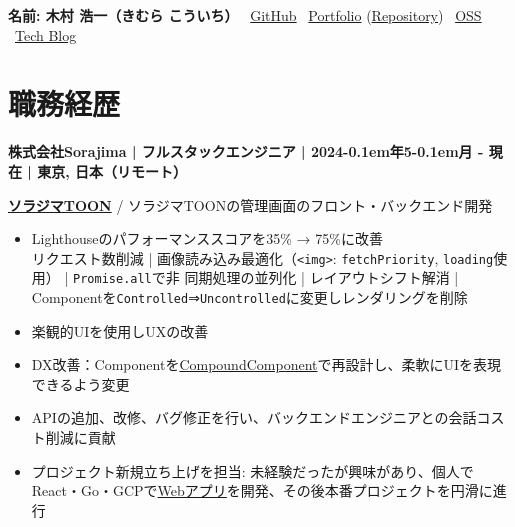 \documentclass{article}
\begin{document}
\noindent
\textbf{\large 名前: 木村 浩一（きむら こういち）} \textbar\
\href{https://github.com/kupuma-ru21}{GitHub} \textbar\
\href{https://kupuma-ru21.com/}{Portfolio} (\href{https://github.com/kupuma-ru21/portfolio}{Repository}) \textbar\
\href{https://github.com/kupuma-ru21/kupuma-ru21/blob/main/OSS.md}{OSS} \textbar\
\href{https://github.com/kupuma-ru21/kupuma-ru21/blob/main/TECH_BLOG.md}{Tech Blog}

\vspace{-1em}

\section*{職務経歴}

\noindent
\textbf{株式会社Sorajima | フルスタックエンジニア | 2024\kern-0.1em年5\kern-0.1em月 - 現在 | 東京, 日本（リモート）}

\vspace{0.15em}

\textbf{\href{https://sorajimatoon.com/}{ソラジマTOON}} / ソラジマTOONの管理画面のフロント・バックエンド開発

\begin{itemize}[leftmargin=1.5em]

  \item Lighthouseのパフォーマンススコアを35\% → 75\%に改善\\
  リクエスト数削減 | 画像読み込み最適化（\texttt{<img>}: \texttt{fetchPriority}, \texttt{loading}使用） | \texttt{Promise.all}で非 同期処理の並列化 | レイアウトシフト解消 | Componentを\texttt{Controlled}⇒\texttt{Uncontrolled}に変更しレンダリングを削除


  \item 楽観的UIを使用しUXの改善

  \item DX改善：Componentを\href{https://kentcdodds.com/blog/compound-components-with-react-hooks}{CompoundComponent}で再設計し、柔軟にUIを表現できるよう変更

  \item APIの追加、改修、バグ修正を行い、バックエンドエンジニアとの会話コスト削減に貢献

  \item プロジェクト新規立ち上げを担当: 未経験だったが興味があり、個人でReact・Go・GCPで\href{https://github.com/kupuma-ru21/portfolio}{Webアプリ}を開発、その後本番プロジェクトを円滑に進行

\end{itemize}
\end{document}
